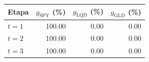 \begin{tabular}{lrrr}
\toprule
Etapa & $g_{\mathrm{SPY}}$ (\%) & $g_{\mathrm{LQD}}$ (\%) & $g_{\mathrm{GLD}}$ (\%) \\
\midrule
$t=1$ & 100.00 & 0.00 & 0.00 \\
$t=2$ & 100.00 & 0.00 & 0.00 \\
$t=3$ & 100.00 & 0.00 & 0.00 \\
\bottomrule
\end{tabular}
